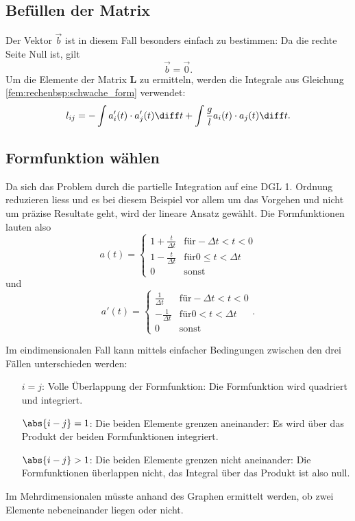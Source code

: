 \subsection{Befüllen der Matrix}
Der Vektor $\vec{b}$ ist in diesem Fall besonders einfach zu bestimmen: Da die rechte Seite Null ist, gilt
\begin{equation}
    \vec{b} = \vec{0}.
\end{equation}
Um die Elemente der Matrix $\mathbf{L}$ zu ermitteln, werden die Integrale aus Gleichung \ref{fem:rechenbsp:schwache_form} verwendet:
\begin{equation}
    l_{ij} = - \int a_i'(t) \cdot a_j'(t) \diff t + \int \frac{g}{l} a_i(t) \cdot a_j(t) \diff t.
\end{equation}


\subsection{Formfunktion wählen}
Da sich das Problem durch die partielle Integration auf eine DGL 1. Ordnung reduzieren liess und es bei diesem Beispiel vor allem um das Vorgehen und nicht um präzise Resultate geht, wird der lineare Ansatz gewählt.
Die Formfunktionen lauten also 
\begin{equation}
    a(t) = \left\{ \begin{array}{ll}
        1+\frac{t}{\Delta t} & \mbox{für} -\Delta t < t < 0 \\
        1-\frac{t}{\Delta t} & \mbox{für} 0 \leq t < \Delta t \\
        0 & \mbox{sonst}
    \end{array} \right.
\end{equation}
und
\begin{equation}
    a'(t) = \left\{ \begin{array}{ll}
        \frac{1}{\Delta t} & \mbox{für} -\Delta t < t < 0 \\
        -\frac{1}{\Delta t} & \mbox{für} 0 < t < \Delta t \\
        0 & \mbox{sonst}
    \end{array} \right. .
\end{equation}

Im eindimensionalen Fall kann mittels einfacher Bedingungen zwischen den drei Fällen unterschieden werden:
\begin{itemize}
    \item[$i = j$:] Volle Überlappung der Formfunktion: Die Formfunktion wird quadriert und integriert. 
    \item[$\abs{i - j} = 1$:] Die beiden Elemente grenzen aneinander: Es wird über das Produkt der beiden Formfunktionen integriert.
    \item[$\abs{i - j} > 1$:] Die beiden Elemente grenzen nicht aneinander: Die Formfunktionen überlappen nicht, das Integral über das Produkt ist also null.
\end{itemize}
Im Mehrdimensionalen müsste anhand des Graphen ermittelt werden, ob zwei Elemente nebeneinander liegen oder nicht.

